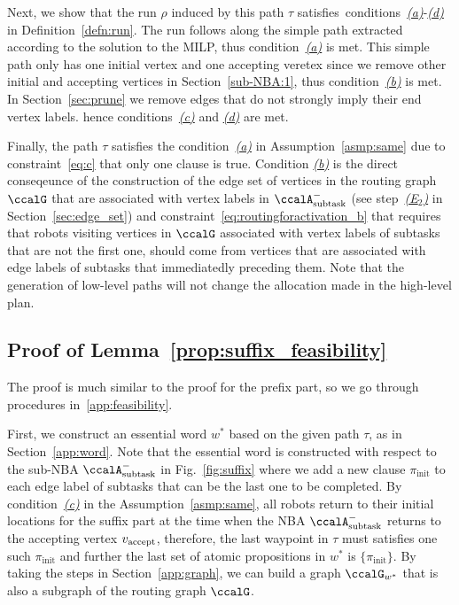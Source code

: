 \documentclass[Afour,sageh,times]{sagej}
\newcommand{\auto}[1]{\ccalA_{\textup{#1}}}
\newcommand{\vertex}[1]{v_{\textup{#1}}}
\begin{document}
{{Next, we show that the run $\rho$ induced by this path $\tau$ satisfies~conditions~\hyperref[cond:a]{\it (a)}-\hyperref[cond:d]{\it (d)} in Definition~\ref{defn:run}. The run  follows along the simple path extracted according to the solution to the MILP, thus condition~\hyperref[cond:a]{\it (a)} is met. This simple path only has one initial vertex and one accepting veretex since we remove other initial and accepting vertices in Section~\ref{sub-NBA:1}, thus condition~\hyperref[cond:b]{\it (b)} is met. In Section~\ref{sec:prune} we remove edges that do not strongly imply their end vertex labels. hence conditions~\hyperref[cond:c]{\it (c)} and \hyperref[cond:d]{\it (d)} are  met.

Finally, the path $\tau$ satisfies the condition~\hyperref[asmp:a]{\it (a)} in Assumption~\ref{asmp:same} due to constraint~\eqref{eq:c} that only one clause is true.  Condition \hyperref[asmp:b]{\it (b)} is the direct conseqeunce of the construction of the edge set of vertices in the routing graph $\ccalG$ that are associated with vertex labels in $\auto{subtask}^-$ (see step~\hyperref[edge:vertex2]{\it (E$_2$)} in Section~\ref{sec:edge_set}) and constraint~\eqref{eq:routingforactivation_b} that requires that robots visiting vertices in $\ccalG$  associated with vertex labels of subtasks that are not the first one, should come from vertices that are associated with edge labels of  subtasks that immediatedly preceding them. Note that the generation of low-level paths will not change the allocation made in the high-level plan.

\subsection{Proof of Lemma~\ref{prop:suffix_feasibility}}\label{app:suffix_feasibility}
The proof is much similar to the proof for the prefix part, so we go through procedures in~\ref{app:feasibility}.

First, we construct an essential word $w^*$ based on the given path $\tau$, as in Section~\ref{app:word}.  Note that the essential word is constructed with respect to the sub-NBA $\auto{subtask}^-$ in Fig.~\ref{fig:suffix} where we add a new clause $\pi_{\text{init}}$ to each edge label of subtasks that can be the last one to be completed. By condition~\hyperref[asmp:c]{\it (c)} in the Assumption~\ref{asmp:same}, all robots return to their initial locations for the suffix part at the  time when the NBA $\auto{subtask}^-$ returns to the accepting vertex $\vertex{accept}$, therefore, the last waypoint in $\tau$ must satisfies one such $\pi_{\text{init}}$ and further the last set of atomic propositions in $w^*$ is $\{\pi_{\text{init}}\}$. By taking the steps in Section~\ref{app:graph}, we can build a graph $\ccalG_{w^*}$ that is also a subgraph of the routing graph $\ccalG$.

}}
\end{document}
